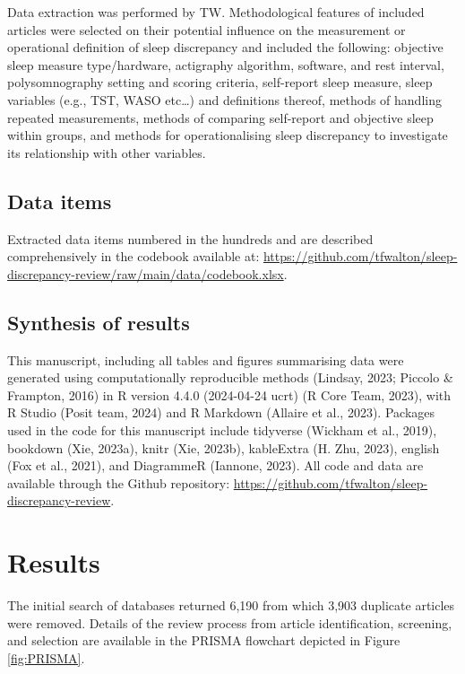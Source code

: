 \documentclass[
]{article}
\begin{document}
Data extraction was performed by TW. Methodological features of included articles were selected on their potential influence on the measurement or operational definition of sleep discrepancy and included the following: objective sleep measure type/hardware, actigraphy algorithm, software, and rest interval, polysomnography setting and scoring criteria, self-report sleep measure, sleep variables (e.g., TST, WASO etc\ldots) and definitions thereof, methods of handling repeated measurements, methods of comparing self-report and objective sleep within groups, and methods for operationalising sleep discrepancy to investigate its relationship with other variables.

\subsection{Data items}\label{item11}

Extracted data items numbered in the hundreds and are described comprehensively in the codebook available at: \url{https://github.com/tfwalton/sleep-discrepancy-review/raw/main/data/codebook.xlsx}.

\subsection{Synthesis of results}\label{item13}

This manuscript, including all tables and figures summarising data were generated using computationally reproducible methods (Lindsay, 2023; Piccolo \& Frampton, 2016) in R version 4.4.0 (2024-04-24 ucrt) (R Core Team, 2023), with R Studio (Posit team, 2024) and R Markdown (Allaire et al., 2023). Packages used in the code for this manuscript include tidyverse (Wickham et al., 2019), bookdown (Xie, 2023a), knitr (Xie, 2023b), kableExtra (H. Zhu, 2023), english (Fox et al., 2021), and DiagrammeR (Iannone, 2023). All code and data are available through the Github repository: \url{https://github.com/tfwalton/sleep-discrepancy-review}.

\section{Results}\label{item14}

The initial search of databases returned 6,190 from which 3,903 duplicate articles were removed. Details of the review process from article identification, screening, and selection are available in the PRISMA flowchart depicted in Figure \ref{fig:PRISMA}.
\end{document}
